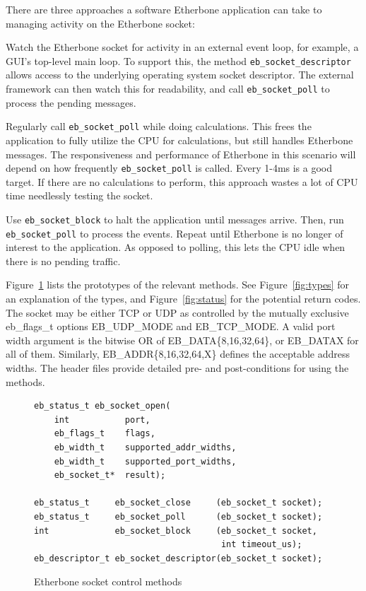 \documentclass{article}
\newenvironment{packed_enum}{
\begin{enumerate}
  \setlength{\itemsep}{1pt}
  \setlength{\parskip}{0pt}
  \setlength{\parsep}{0pt}
}{\end{enumerate}}
\begin{document}
There are three approaches a software Etherbone application can take to
managing activity on the Etherbone socket:
\begin{packed_enum}
\item 
Watch the Etherbone socket for activity in an external event loop,
for example, a GUI's top-level main loop. 
To support this, the method \texttt{eb\_socket\_descriptor} allows access to the
underlying operating system socket descriptor.
The external framework can then watch this for readability,
and call \texttt{eb\_socket\_poll} to process the pending messages.
\item
Regularly call \texttt{eb\_socket\_poll} while doing calculations.
This frees the application to fully utilize the CPU for calculations,
but still handles Etherbone messages.
The responsiveness and performance of Etherbone in this scenario will depend
on how frequently \texttt{eb\_socket\_poll} is called. 
Every 1-4ms is a good target.
If there are no calculations to perform, 
this approach wastes a lot of CPU time needlessly testing the socket.
\item
Use \texttt{eb\_socket\_block} to halt the application until messages arrive.
Then, run \texttt{eb\_socket\_poll} to process the events.
Repeat until Etherbone is no longer of interest to the application.
As opposed to polling, 
this lets the CPU idle when there is no pending traffic.
\end{packed_enum}

Figure~\ref{fig:socketm} lists the prototypes of the relevant methods. 
See Figure~\ref{fig:types} for an explanation of the types,
and Figure~\ref{fig:status} for the potential return codes.
The socket may be either TCP or UDP as controlled by the mutually exclusive
eb\_flags\_t options EB\_UDP\_MODE and EB\_TCP\_MODE. 
A valid port width argument is the bitwise OR of EB\_DATA\{8,16,32,64\},
or EB\_DATAX for all of them.
Similarly, EB\_ADDR\{8,16,32,64,X\} defines the acceptable address widths.
The header files provide detailed pre- and post-conditions for using the methods.

\begin{figure}
\centering
\begin{lstlisting}
eb_status_t eb_socket_open(
    int           port, 
    eb_flags_t    flags,
    eb_width_t    supported_addr_widths,
    eb_width_t    supported_port_widths,
    eb_socket_t*  result);

eb_status_t     eb_socket_close     (eb_socket_t socket);
eb_status_t     eb_socket_poll      (eb_socket_t socket); 
int             eb_socket_block     (eb_socket_t socket, 
                                     int timeout_us);
eb_descriptor_t eb_socket_descriptor(eb_socket_t socket);
\end{lstlisting}
\caption{Etherbone socket control methods}
\label{fig:socketm}
\end{figure}
\end{document}
